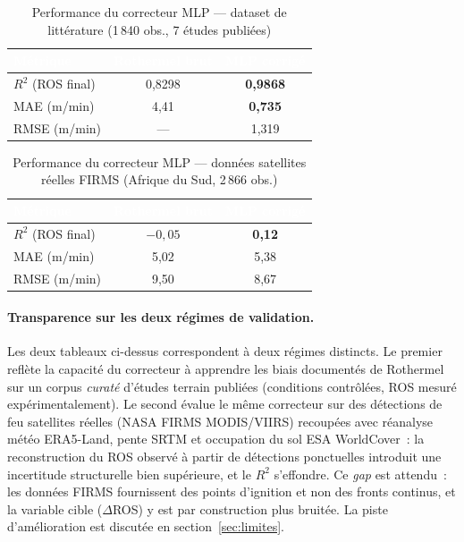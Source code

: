 \begin{table}[H]
\centering
\caption{Performance du correcteur MLP --- dataset de littérature (1\,840 obs., 7 études publiées)}
\begin{tabular}{|l|c|c|}
\hline
\rowcolor{NavyBlue} \textcolor{white}{\textbf{Métrique}} & \textcolor{white}{\textbf{Rothermel brut}} & \textcolor{white}{\textbf{MLP corrigé}} \\
\hline
$R^2$ (ROS final) & 0,8298 & \textbf{0,9868} \\
MAE (m/min) & 4,41 & \textbf{0,735} \\
RMSE (m/min) & --- & 1,319 \\
\hline
\end{tabular}
\end{table}

\begin{table}[H]
\centering
\caption{Performance du correcteur MLP --- données satellites réelles FIRMS (Afrique du Sud, 2\,866 obs.)}
\begin{tabular}{|l|c|c|}
\hline
\rowcolor{NavyBlue} \textcolor{white}{\textbf{Métrique}} & \textcolor{white}{\textbf{Rothermel brut}} & \textcolor{white}{\textbf{MLP corrigé}} \\
\hline
$R^2$ (ROS final) & $-0{,}05$ & \textbf{0,12} \\
MAE (m/min) & 5,02 & 5,38 \\
RMSE (m/min) & 9,50 & 8,67 \\
\hline
\end{tabular}
\end{table}

\paragraph{Transparence sur les deux régimes de validation.} Les deux tableaux ci-dessus correspondent à deux régimes distincts. Le premier reflète la capacité du correcteur à apprendre les biais documentés de Rothermel sur un corpus \textit{curaté} d'études terrain publiées (conditions contrôlées, ROS mesuré expérimentalement). Le second évalue le même correcteur sur des détections de feu satellites réelles (NASA FIRMS MODIS/VIIRS) recoupées avec réanalyse météo ERA5-Land, pente SRTM et occupation du sol ESA WorldCover~: la reconstruction du ROS observé à partir de détections ponctuelles introduit une incertitude structurelle bien supérieure, et le $R^2$ s'effondre. Ce \textit{gap} est attendu~: les données FIRMS fournissent des points d'ignition et non des fronts continus, et la variable cible ($\Delta$ROS) y est par construction plus bruitée. La piste d'amélioration est discutée en section~\ref{sec:limites}.

